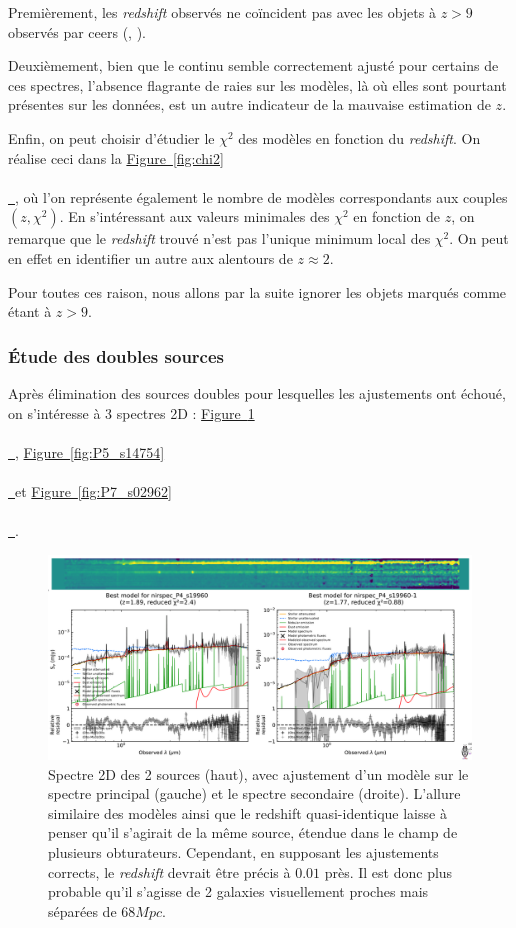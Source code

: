 \documentclass[12pt, a4paper]{article}
\newcommand*{\figref}[2][]{%
  \hyperref[{#2}]{%
    Figure~\ref*{#2}%
    \ifx\\#1\\%
    \else
      \,#1%
    \fi
  }%
}
\begin{document}
Premièrement, les \textit{redshift} observés ne coïncident pas avec les objets à $z > 9$ observés par \gls{ceers} (\cite{2024ApJ...969L...2F}, \cite{ceers_high_redshift}).

Deuxièmement, bien que le continu semble correctement ajusté pour certains de ces spectres, l'absence flagrante de raies sur les modèles, là où elles sont pourtant présentes sur les données, est un autre indicateur de la mauvaise estimation de $z$.

Enfin, on peut choisir d'étudier le $\chi^2$ des modèles en fonction du \textit{redshift}. On réalise ceci dans la \figref{fig:chi2}, où l'on représente également le nombre de modèles correspondants aux couples $(z,\chi^2)$. En s'intéressant aux valeurs minimales des $\chi^2$ en fonction de $z$, on remarque que le \textit{redshift} trouvé n'est pas l'unique minimum local des $\chi^2$. On peut en effet en identifier un autre aux alentours de $z \approx 2$.

Pour toutes ces raison, nous allons par la suite ignorer les objets marqués comme étant à $z > 9$.

\subsubsection{Étude des doubles sources}

Après élimination des sources doubles pour lesquelles les ajustements ont échoué, on s'intéresse à 3 spectres 2D : \figref{fig:P4_s19960}, \figref{fig:P5_s14754} et \figref{fig:P7_s02962}.

\begin{figure}[!h]
  \centering
  \includegraphics[width=1\textwidth]{assets/double_P4_s19960.png}
  \caption{Spectre 2D des 2 sources (haut), avec ajustement d'un modèle sur le spectre principal (gauche) et le spectre secondaire (droite). L'allure similaire des modèles ainsi que le redshift quasi-identique laisse à penser qu'il s'agirait de la même source, étendue dans le champ de plusieurs obturateurs. Cependant, en supposant les ajustements corrects, le \textit{redshift} devrait être précis à $0.01$ près. Il est donc plus probable qu'il s'agisse de 2 galaxies visuellement proches mais séparées de $68 Mpc$.}
  \label{fig:P4_s19960}
\end{figure}
\end{document}
